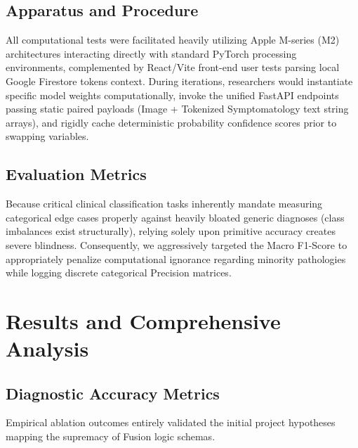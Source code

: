 \documentclass[11pt,a4paper]{article}
\begin{document}
\subsection{Apparatus and Procedure}
All computational tests were facilitated heavily utilizing Apple M-series (M2) architectures interacting directly with standard PyTorch processing environments, complemented by React/Vite front-end user tests parsing local Google Firestore tokens context. During iterations, researchers would instantiate specific model weights computationally, invoke the unified FastAPI endpoints passing static paired payloads (Image + Tokenized Symptomatology text string arrays), and rigidly cache deterministic probability confidence scores prior to swapping variables.

\subsection{Evaluation Metrics}
Because critical clinical classification tasks inherently mandate measuring categorical edge cases properly against heavily bloated generic diagnoses (class imbalances exist structurally), relying solely upon primitive accuracy creates severe blindness. Consequently, we aggressively targeted the Macro F1-Score to appropriately penalize computational ignorance regarding minority pathologies while logging discrete categorical Precision matrices.


\section{Results and Comprehensive Analysis}

\subsection{Diagnostic Accuracy Metrics}
Empirical ablation outcomes entirely validated the initial project hypotheses mapping the supremacy of Fusion logic schemas.

\begin{table}[htbp]
\centering
{}
\caption{System performance metrics proving the exact quantifiable capability leap gained when seamlessly merging Text and Imaging capabilities under the complete Fusion framework.}
\label{tab:quantitative_metrics}
\end{table}
\end{document}
